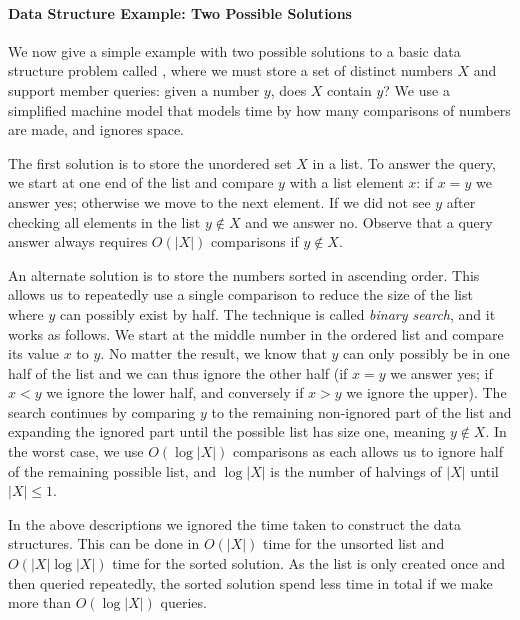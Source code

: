\begin{leftbar}
    \vspace{-1.4em} \paragraph{Data Structure Example: Two Possible Solutions}
    We now give a simple example with two possible solutions to a basic data structure problem called , where we must
    store a set of distinct numbers $X$ and support member queries: given a number $y$, does $X$ contain $y$? We use a simplified machine model that models time by how many comparisons of numbers are made, and ignores space.
    
    The first solution is to store the unordered set $X$ in a list. To answer the query, we start at one end of the list and compare $y$ with a list element $x$: if $x = y$ we answer yes; otherwise we move to the next element. If we did not see $y$ after checking all elements in the list $y \not\in X$ and we answer no. Observe that a query answer always requires $O(|X|)$ comparisons if $y \not\in X$.
 
    An alternate solution is to store the numbers sorted in ascending order.
    This allows us to repeatedly use a single comparison to reduce the size of the list where $y$ can possibly exist by half. The technique is called \emph{binary search}, and  %
    it works as follows. We start at the middle number in the ordered list and compare its value $x$ to $y$. No matter the result, we know that $y$ can only possibly be in one half of the list and we can thus ignore the other half (if $x = y$ we answer yes; if $x < y$ we ignore the lower half, and conversely if $x > y$ we ignore the upper). The search continues by comparing $y$ to the remaining non-ignored part of the list and expanding the ignored part until the possible list has size one, meaning $y \not\in X$. In the worst case, we use $O(\log |X|)$ comparisons as each allows us to ignore half of the remaining possible list, and $\log |X|$ is the number of halvings of $|X|$ until $|X| \leq 1$.
    
    In the above descriptions we ignored the time taken to construct the data structures. This can be done in $O(|X|)$ time for the unsorted list and $O(|X| \log |X|)$ time for the sorted solution. As the list is only created once and then queried repeatedly, the sorted solution spend less time in total if we make more than $O(\log |X|)$ queries.    
\end{leftbar}

